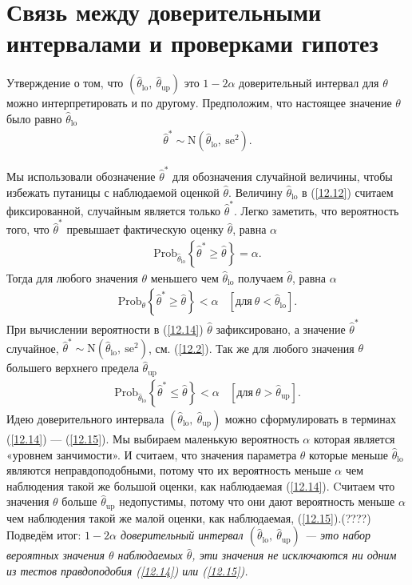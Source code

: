 \section{Связь между доверительными интервалами и проверками гипотез}
Утверждение о том, что $(\widehat{\theta}_{\text{lo}},\  \widehat{\theta}_{\text{up}})$ это $1 - 2 \alpha$ доверительный интервал для $\theta$ можно интерпретировать и по другому. Предположим, что настоящее значение $\theta$ было равно $\widehat{\theta}_{\text{lo}}$
\begin{gather}\label{12.12}
\widehat{\theta}^{*} \sim \mathrm{N}(\hat{\theta}_{\text{lo}}, \ \text{se}^{2}).
\end{gather}

Мы использовали обозначение $\widehat{\theta}^{*}$ для обозначения случайной величины, чтобы избежать путаницы с наблюдаемой оценкой $\widehat{\theta}$. Величину $\widehat{\theta}_{\text{lo}}$ в (\ref{12.12}) считаем фиксированной, случайным является только $\widehat{\theta}^{*}$. Легко заметить, что вероятность того, что $\widehat{\theta}^{*}$ превышает фактическую оценку $\widehat{\theta}$, равна $\alpha$
\begin{gather}\label{12.13}
\text{Prob}_{\widehat{\theta}_{\text{lo}}} \left\{ \widehat{\theta}^{*} \ge \widehat{\theta}  \right\} = \alpha.
\end{gather}
Тогда для любого значения $\theta$ меньшего чем $\widehat{\theta}_{\text{lo}}$ получаем
$\widehat{\theta}$, равна $\alpha$
\begin{gather}\label{12.14}
\text{Prob}_{\theta} \left\{\widehat{\theta}^{*} \ge \widehat{\theta}  \right\} < \alpha \ \ \ \ [\text{для} \  \theta < \widehat{\theta}_{\text{lo}}].
\end{gather}
При вычислении вероятности в (\ref{12.14}) $\widehat{\theta}$ зафиксировано, а значение $\widehat{\theta}^{*}$ случайное, $\widehat{\theta}^{*} \sim \mathrm{N}(\widehat{\theta}_{\text{lo}}, \ \text{se}^{2})$, см. (\ref{12.2}). Так же для любого значения $\theta$ большего верхнего предела $\widehat{\theta}_{\text{up}}$
\begin{gather}\label{12.15}
\text{Prob}_{\widehat{\theta}_{\text{lo}}}\left\{\widehat{\theta}^{*} \le \widehat{\theta}  \right\} < \alpha \ \ \ \ [\text{для} \  \theta > \widehat{\theta}_{\text{up}}].
\end{gather}
Идею доверительного интервала $(\widehat{\theta}_{\text{lo}}, \ \widehat{\theta}_{\text{up}})$ можно сформулировать в терминах (\ref{12.14}) --- (\ref{12.15}). Мы выбираем маленькую вероятность $\alpha$ которая является «уровнем занчимости». И считаем, что значения параметра $\theta$ которые меньше $\widehat{\theta}_{\text{lo}}$ являются неправдоподобными, потому что их вероятность меньше $\alpha$ чем наблюдения такой же большой оценки, как  наблюдаемая (\ref{12.14}). Cчитаем что значения $\theta$ больше $ \widehat{\theta}_{\text{up}}$ недопустимы, потому что они дают вероятность меньше $\alpha$ чем наблюдения такой же малой оценки, как наблюдаемая, (\ref{12.15}).(????) Подведём итог: \textit{$1 - 2 \alpha$ доверительный интервал $(\widehat{\theta}_{\text{lo}}, \ \widehat{\theta}_{\text{up}})$ --- это набор вероятных значения $\theta$ наблюдаемых $\widehat{\theta}$, эти значения не исключаются ни одним из тестов правдоподобия (\ref{12.14}) или (\ref{12.15}).}
